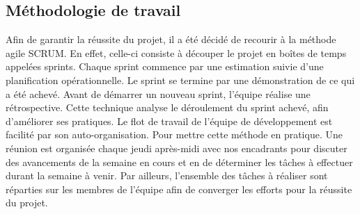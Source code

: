 	\subsection {Méthodologie de travail }
	Afin de garantir la réussite du projet, il a été décidé de recourir à la méthode agile SCRUM. En effet, celle-ci consiste à découper le projet en boîtes de temps appelées sprints. Chaque sprint commence par une estimation suivie d'une planification opérationnelle. Le sprint se termine par une démonstration de ce qui a été achevé. Avant de démarrer un nouveau sprint, l'équipe réalise une rétrospective. Cette technique analyse le déroulement du sprint achevé, afin d'améliorer ses pratiques. Le flot de travail de l'équipe de développement est facilité par son auto-organisation. 
	Pour mettre cette méthode en pratique. Une réunion est organisée chaque jeudi après-midi avec nos encadrants pour discuter des avancements de la semaine en cours et en de déterminer les tâches à effectuer durant la semaine à venir. Par ailleurs, l’ensemble des tâches à réaliser sont réparties sur les membres de l’équipe afin de converger les efforts pour la réussite du projet. 
	
